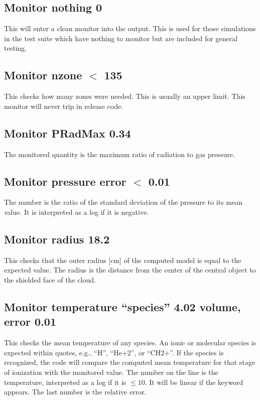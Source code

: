 \subsection{Monitor nothing 0}

This will enter a clean monitor into the output.
This is used for those
simulations in the test suite which have nothing to
monitor but are included
for general testing.

\subsection{Monitor nzone $<$ 135}

This checks how many zones were needed.
This is usually an upper limit.
This monitor will never trip in release code.

\subsection{Monitor PRadMax 0.34}

The monitored quantity is the maximum ratio of radiation to gas pressure.

\subsection{Monitor pressure error $<$ 0.01}

The number is the ratio of the standard deviation of the pressure to
its mean value.
It is interpreted as a log if it is negative.

\subsection{Monitor radius 18.2}

This checks that the outer radius [cm] of the computed model is equal
to the expected value.
The radius is the distance from the center of the
central object to the shielded face of the cloud.

\subsection{Monitor temperature ``species'' 4.02 volume, error 0.01}

This checks the mean temperature of any species.
An ionic or molecular species is expected within quotes,
e.g., ``H'', ``He+2'', or ``CH2+''.
If the species is recognized, the code will compare the computed mean
temperature for that stage of ionization with the monitored value.
The number on the line is the temperature, interpreted as a log if
it is $\le 10$.
It will be linear if the keyword  appears.
The last number is the relative error.

